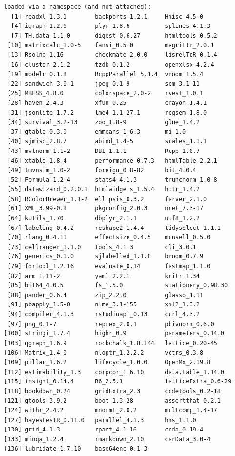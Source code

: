 \documentclass[
]{book}
\begin{document}
\begin{verbatim}
loaded via a namespace (and not attached):
  [1] readxl_1.3.1        backports_1.2.1     Hmisc_4.5-0        
  [4] igraph_1.2.6        plyr_1.8.6          splines_4.1.3      
  [7] TH.data_1.1-0       digest_0.6.27       htmltools_0.5.2    
 [10] matrixcalc_1.0-5    fansi_0.5.0         magrittr_2.0.1     
 [13] Rsolnp_1.16         checkmate_2.0.0     lisrelToR_0.1.4    
 [16] cluster_2.1.2       tzdb_0.1.2          openxlsx_4.2.4     
 [19] modelr_0.1.8        RcppParallel_5.1.4  vroom_1.5.4        
 [22] sandwich_3.0-1      jpeg_0.1-9          sem_3.1-11         
 [25] MBESS_4.8.0         colorspace_2.0-2    rvest_1.0.1        
 [28] haven_2.4.3         xfun_0.25           crayon_1.4.1       
 [31] jsonlite_1.7.2      lme4_1.1-27.1       regsem_1.8.0       
 [34] survival_3.2-13     zoo_1.8-9           glue_1.4.2         
 [37] gtable_0.3.0        emmeans_1.6.3       mi_1.0             
 [40] sjmisc_2.8.7        abind_1.4-5         scales_1.1.1       
 [43] mvtnorm_1.1-2       DBI_1.1.1           Rcpp_1.0.7         
 [46] xtable_1.8-4        performance_0.7.3   htmlTable_2.2.1    
 [49] tmvnsim_1.0-2       foreign_0.8-82      bit_4.0.4          
 [52] Formula_1.2-4       stats4_4.1.3        truncnorm_1.0-8    
 [55] datawizard_0.2.0.1  htmlwidgets_1.5.4   httr_1.4.2         
 [58] RColorBrewer_1.1-2  ellipsis_0.3.2      farver_2.1.0       
 [61] XML_3.99-0.8        pkgconfig_2.0.3     nnet_7.3-17        
 [64] kutils_1.70         dbplyr_2.1.1        utf8_1.2.2         
 [67] labeling_0.4.2      reshape2_1.4.4      tidyselect_1.1.1   
 [70] rlang_0.4.11        effectsize_0.4.5    munsell_0.5.0      
 [73] cellranger_1.1.0    tools_4.1.3         cli_3.0.1          
 [76] generics_0.1.0      sjlabelled_1.1.8    broom_0.7.9        
 [79] fdrtool_1.2.16      evaluate_0.14       fastmap_1.1.0      
 [82] arm_1.11-2          yaml_2.2.1          knitr_1.34         
 [85] bit64_4.0.5         fs_1.5.0            stationery_0.98.30 
 [88] pander_0.6.4        zip_2.2.0           glasso_1.11        
 [91] pbapply_1.5-0       nlme_3.1-155        xml2_1.3.2         
 [94] compiler_4.1.3      rstudioapi_0.13     curl_4.3.2         
 [97] png_0.1-7           reprex_2.0.1        pbivnorm_0.6.0     
[100] stringi_1.7.4       highr_0.9           parameters_0.14.0  
[103] qgraph_1.6.9        rockchalk_1.8.144   lattice_0.20-45    
[106] Matrix_1.4-0        nloptr_1.2.2.2      vctrs_0.3.8        
[109] pillar_1.6.2        lifecycle_1.0.0     OpenMx_2.19.8      
[112] estimability_1.3    corpcor_1.6.10      data.table_1.14.0  
[115] insight_0.14.4      R6_2.5.1            latticeExtra_0.6-29
[118] bookdown_0.24       gridExtra_2.3       codetools_0.2-18   
[121] gtools_3.9.2        boot_1.3-28         assertthat_0.2.1   
[124] withr_2.4.2         mnormt_2.0.2        multcomp_1.4-17    
[127] bayestestR_0.11.0   parallel_4.1.3      hms_1.1.0          
[130] grid_4.1.3          rpart_4.1.16        coda_0.19-4        
[133] minqa_1.2.4         rmarkdown_2.10      carData_3.0-4      
[136] lubridate_1.7.10    base64enc_0.1-3    
\end{verbatim}

  
\end{document}
